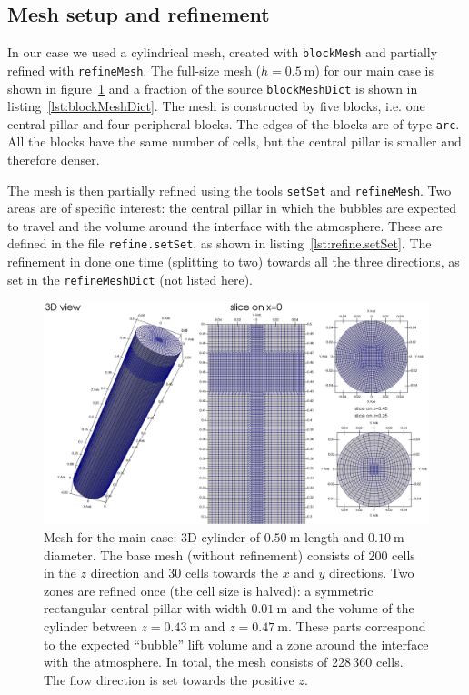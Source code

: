 \documentclass[11pt, a4paper, twoside]{article}
\begin{document}
\subsection{Mesh setup and refinement}
In our case we used a cylindrical mesh, created with \texttt{blockMesh} and partially refined with \texttt{refineMesh}. The full-size mesh ($h=\SI{0.5}{\metre}$) for our main case is shown in figure~\ref{fig:main_mesh} and a fraction of the source \texttt{blockMeshDict} is shown in listing~\ref{lst:blockMeshDict}. The mesh is constructed by five blocks, i.e. one central pillar and four peripheral blocks. The edges of the blocks are of type \texttt{arc}. All the blocks have the same number of cells, but the central pillar is smaller and therefore denser.

The mesh is then partially refined using the tools \texttt{setSet} and \texttt{refineMesh}. Two areas are of specific interest: the central pillar in which the bubbles are expected to travel and the volume around the interface with the atmosphere. These are defined in the file \texttt{refine.setSet}, as shown in listing~\ref{lst:refine.setSet}. The refinement in done one time (splitting to two) towards all the three directions, as set in the \texttt{refineMeshDict} (not listed here).

\begin{figure}
    \centering
    \includegraphics[width=\textwidth]{figures/main/mesh_print.png}
    \caption{Mesh for the main case: 3D cylinder of $\SI{0.50}{\metre}$ length and $\SI{0.10}{\metre}$ diameter. The base mesh (without refinement) consists of 200 cells in the $z$ direction and 30 cells towards the $x$ and $y$ directions. Two zones are refined once (the cell size is halved): a symmetric rectangular central pillar with width $\SI{0.01}{\metre}$ and the volume of the cylinder between $z=\SI{0.43}{\metre}$ and $z=\SI{0.47}{\metre}$. These parts correspond to the expected ``bubble'' lift volume and a zone around the interface with the atmosphere. In total, the mesh consists of 228\,360 cells. The flow direction is set towards the positive $z$.}
    \label{fig:main_mesh}
\end{figure}
\end{document}
